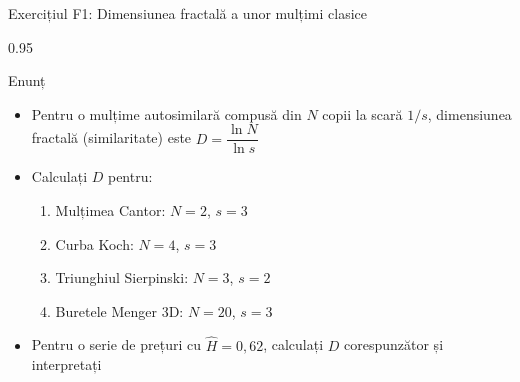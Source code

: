 \documentclass[9pt, aspectratio=169, t]{beamer}
\begin{document}
\begin{frame}[shrink=25]{Exercițiul F1: Dimensiunea fractală a unor mulțimi clasice}
\begin{cminipage}{0.95\textwidth}
\begin{block}{Enunț}
\begin{itemize}\setlength{\itemsep}{0pt}
    \item Pentru o mulțime autosimilară compusă din $N$ copii la scară $1/s$, dimensiunea fractală (similaritate) este
    $D = \dfrac{\ln N}{\ln s}$
    \item Calculați $D$ pentru:
    \begin{enumerate}\setlength{\itemsep}{0pt}
        \item Mulțimea Cantor: $N = 2$, $s = 3$
        \item Curba Koch: $N = 4$, $s = 3$
        \item Triunghiul Sierpinski: $N = 3$, $s = 2$
        \item Buretele Menger 3D: $N = 20$, $s = 3$
    \end{enumerate}
    \item Pentru o serie de prețuri cu $\hat H = 0{,}62$, calculați $D$ corespunzător și interpretați
\end{itemize}
\end{block}
\end{cminipage}
\end{frame}
\end{document}
